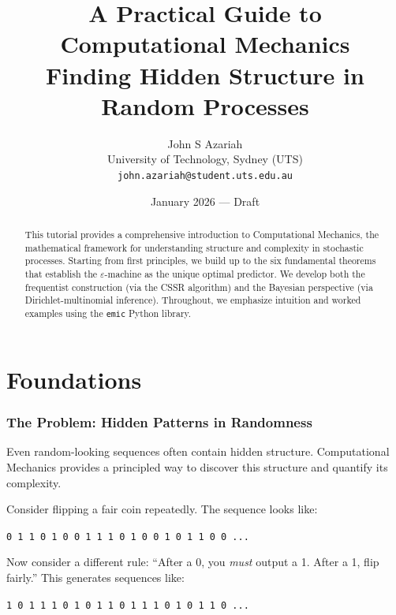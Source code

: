 \documentclass[11pt,a4paper]{article}
\title{%
    \vspace{-2em}
    {\Large A Practical Guide to}\\[0.5em]
    {\Huge\bfseries Computational Mechanics}\\[0.5em]
    {\large Finding Hidden Structure in Random Processes}
}
\author{%
    John S Azariah\\
    \small University of Technology, Sydney (UTS)\\
    \small\texttt{john.azariah@student.uts.edu.au}
}
\date{January 2026 --- Draft}
\theoremstyle{definition}
\theoremstyle{plain}
\newcommand{\eps}{\varepsilon}
\begin{document}
\maketitle

\begin{abstract}
This tutorial provides a comprehensive introduction to Computational Mechanics, the mathematical framework for understanding structure and complexity in stochastic processes. Starting from first principles, we build up to the six fundamental theorems that establish the $\eps$-machine as the unique optimal predictor. We develop both the frequentist construction (via the CSSR algorithm) and the Bayesian perspective (via Dirichlet-multinomial inference). Throughout, we emphasize intuition and worked examples using the \texttt{emic} Python library.
\end{abstract}

\tableofcontents
\newpage

\part{Foundations}

\section{The Problem: Hidden Patterns in Randomness}
\label{sec:problem}

\begin{keyidea}
Even random-looking sequences often contain hidden structure. Computational Mechanics provides a principled way to discover this structure and quantify its complexity.
\end{keyidea}

Consider flipping a fair coin repeatedly. The sequence looks like:
\begin{center}
\texttt{0 1 1 0 1 0 0 1 1 1 0 1 0 0 1 0 1 1 0 0 ...}
\end{center}

Now consider a different rule: ``After a 0, you \emph{must} output a 1. After a 1, flip fairly.'' This generates sequences like:
\begin{center}
\texttt{1 0 1 1 1 0 1 0 1 1 0 1 1 1 0 1 0 1 1 0 ...}
\end{center}
\end{document}
